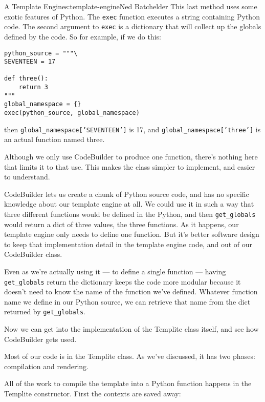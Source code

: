 \begin{aosachapter}{A Template Engine}{s:template-engine}{Ned Batchelder}
This last method uses some exotic features of Python. The \texttt{exec}
function executes a string containing Python code. The second argument
to \texttt{exec} is a dictionary that will collect up the globals
defined by the code. So for example, if we do this:

\begin{verbatim}
python_source = """\
SEVENTEEN = 17

def three():
    return 3
"""
global_namespace = {}
exec(python_source, global_namespace)
\end{verbatim}

then \texttt{global\_namespace{[}'SEVENTEEN'{]}} is 17, and
\texttt{global\_namespace{[}'three'{]}} is an actual function named
three.

Although we only use CodeBuilder to produce one function, there's
nothing here that limits it to that use. This makes the class simpler to
implement, and easier to understand.

CodeBuilder lets us create a chunk of Python source code, and has no
specific knowledge about our template engine at all. We could use it in
such a way that three different functions would be defined in the
Python, and then \texttt{get\_globals} would return a dict of three
values, the three functions. As it happens, our template engine only
needs to define one function. But it's better software design to keep
that implementation detail in the template engine code, and out of our
CodeBuilder class.

Even as we're actually using it --- to define a single function ---
having \texttt{get\_globals} return the dictionary keeps the code more
modular because it doesn't need to know the name of the function we've
defined. Whatever function name we define in our Python source, we can
retrieve that name from the dict returned by \texttt{get\_globals}.

Now we can get into the implementation of the Templite class itself, and
see how CodeBuilder gets used.

\label{the-templite-class-implementation}

Most of our code is in the Templite class. As we've discussed, it has
two phases: compilation and rendering.

\label{compiling}

All of the work to compile the template into a Python function happens
in the Templite constructor. First the contexts are saved away:


\end{aosachapter}
